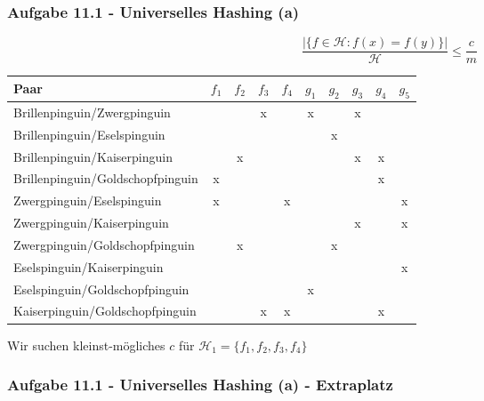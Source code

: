 \documentclass{beamer}
\begin{document}
\begin{frame}[t]
	\frametitle{Aufgabe 11.1 - Universelles Hashing (a)}
	\scriptsize
	$$\frac{|\{ f \in \mathcal{H} : f(x) = f(y) \}|}{\mathcal{H}} \leq \frac{c}{m}$$
	\begin{table}
		\tiny
		\centering
		\begin{tabular}{|l||c|c|c|c||c|c|c|c|c|}
			\hline
			Paar                             & $f_1$ & $f_2$ & $f_3$ & $f_4$ & $g_1$ & $g_2$ & $g_3$ & $g_4$ & $g_5$ \\
			\hline\hline
			Brillenpinguin/Zwergpinguin      &       &       & x     &       & x     &       & x     &       &       \\
			\hline
			Brillenpinguin/Eselspinguin      &       &       &       &       &       & x     &       &       &       \\
			\hline
			Brillenpinguin/Kaiserpinguin     &       & x     &       &       &       &       & x     & x     &       \\
			\hline
			Brillenpinguin/Goldschopfpinguin & x     &       &       &       &       &       &       & x     &       \\
			\hline
			Zwergpinguin/Eselspinguin        & x     &       &       & x     &       &       &       &       & x     \\
			\hline
			Zwergpinguin/Kaiserpinguin       &       &       &       &       &       &       & x     &       & x     \\
			\hline
			Zwergpinguin/Goldschopfpinguin   &       & x     &       &       &       & x     &       &       &       \\
			\hline
			Eselspinguin/Kaiserpinguin       &       &       &       &       &       &       &       &       & x     \\
			\hline
			Eselspinguin/Goldschopfpinguin   &       &       &       &       & x     &       &       &       &       \\
			\hline
			Kaiserpinguin/Goldschopfpinguin  &       &       & x     & x     &       &       &       & x     &       \\
			\hline
		\end{tabular}
	\end{table}

	Wir suchen kleinst-mögliches $c$ für $\mathcal{H}_1 = \{ f_1, f_2, f_3, f_4 \}$
\end{frame}

\begin{frame}
	\frametitle{Aufgabe 11.1 - Universelles Hashing (a) - Extraplatz}
\end{frame}
\end{document}
